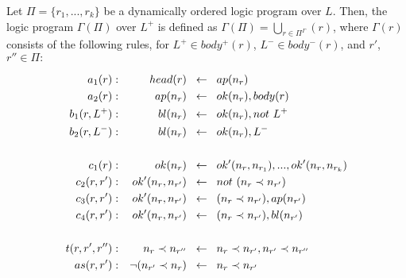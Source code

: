 \begin{definition}
  Let $\Pi = \{r_1, ..., r_k\}$ be a dynamically ordered logic program over $L$.
  Then, the logic program $\Gamma(\Pi)$ over $L^+$ is defined as
  $\Gamma(\Pi) = \bigcup_{r \in \Pi^\Gamma}(r)$, where $\Gamma(r)$ consists of the
  following rules, for $L^+ \in body^+(r)$, $L^- \in body^-(r)$, and $r'$,
  $r'' \in \Pi:$\\
  \begin{minipage}{0.8\textwidth}
    \begin{align*}
      a_1(r): && head(r) \hspace*{0.2cm}&\leftarrow \hspace*{0.2cm} ap(n_r)\\
      a_2(r): && ap(n_r) \hspace*{0.2cm}&\leftarrow \hspace*{0.2cm} ok(n_r), body(r)\\
      b_1(r, L^+): && bl(n_r) \hspace*{0.2cm}&\leftarrow \hspace*{0.2cm} ok(n_r), not~L^+\\
      b_2(r, L^-): && bl(n_r) \hspace*{0.2cm}&\leftarrow \hspace*{0.2cm} ok(n_r), L^-\\
      \\
      c_1(r): && ok(n_r) \hspace*{0.2cm}&\leftarrow \hspace*{0.2cm} ok'(n_r, n_{r_1}), ..., ok'(n_r, n_{r_k})\\
      c_2(r, r'): && ok'(n_r, n_{r'}) \hspace*{0.2cm}&\leftarrow \hspace*{0.2cm} not~(n_r \prec n_{r'})\\
      c_3(r, r'): && ok'(n_r, n_{r'}) \hspace*{0.2cm}&\leftarrow \hspace*{0.2cm} (n_r \prec n_{r'}), ap(n_{r'})\\
      c_4(r, r'): && ok'(n_r, n_{r'}) \hspace*{0.2cm}&\leftarrow \hspace*{0.2cm} (n_r \prec n_{r'}), bl(n_{r'})\\
      \\
      t(r, r', r''): && n_r \prec n_{r''} \hspace*{0.2cm}&\leftarrow \hspace*{0.2cm} n_r \prec n_{r'}, n_{r'} \prec n_{r''}\\
      as(r, r'): && \neg (n_{r'} \prec n_{r}) \hspace*{0.2cm}&\leftarrow \hspace*{0.2cm} n_r \prec n_{r'}
    \end{align*}
  \end{minipage}
\end{definition}


